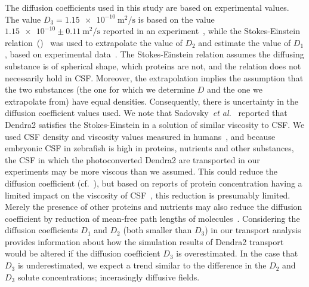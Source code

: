 \documentclass{WileyMSP-template}
\begin{document}
The diffusion coefficients used in this study are based on experimental values. 
The value $D_3=\num{1.15e-10} \ \mathrm{m^2/s}$
is based on the value $\num{1.15e-10} \pm 0.11 \ \mathrm{m^2/s}$ reported in an
experiment~\cite{GuraSadovsky2017MeasurementExpansion}, while the Stokes-Einstein
relation~()~\cite{Einstein1905UberTeilchen} was used to extrapolate
the value of $D_2$ and estimate the value of $D_1$, based on experimental
data~\cite{Swaminathan1997PhotobleachingDiffusion, Potma2001ReducedCells,
Mahmood2023ExosomeTemperature}. The Stokes-Einstein relation assumes the diffusing
substance is of spherical shape, which proteins are not, and the relation does not
necessarily hold in CSF. Moreover, the extrapolation implies the assumption that
the two substances (the one for which we determine $D$ and the one we extrapolate from)
have equal densities. Consequently, there is uncertainty in the diffusion coefficient values used.
We note that Sadovsky~\emph{et al.}~\cite{GuraSadovsky2017MeasurementExpansion} reported that
Dendra2 satisfies the Stokes-Einstein in a solution of similar viscosity
to CSF. We used CSF density and viscosity values measured in
humans~\cite{Bloomfield1998EffectsFluid},
and because embryonic CSF in zebrafish is high in proteins, nutrients and other substances,
the CSF in which the photoconverted Dendra2 are transported in our experiments may be more viscous
than we assumed. This could reduce the diffusion coefficient (cf.~),
but based on reports of protein concentration having a limited impact on the viscosity of
CSF~\cite{Bloomfield1998EffectsFluid, Brydon1995PhysicalViscosity}, this reduction is presumably
limited. Merely the presence of other proteins and nutrients may also reduce the diffusion
coefficient by reduction of mean-free path lengths of molecules~\cite{Cussler2009Diffusion:Systems}.
Considering the diffusion coefficients $D_1$ and $D_2$ (both smaller
than $D_3$) in our transport analysis provides information about how the simulation
results of Dendra2 transport would be altered if the
diffusion coefficient $D_3$ is overestimated. In the case that $D_3$ is underestimated, 
we expect a trend similar to the difference in the $D_2$ and $D_3$ solute concentrations;
incerasingly diffusive fields.
\end{document}
